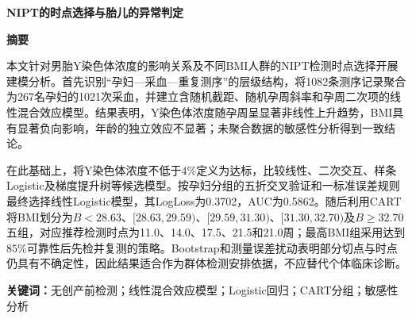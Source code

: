 \documentclass[UTF8,a4paper,12pt,fontset=fandol]{ctexart}
\begin{document}
\setcounter{page}{1}

\begin{center}
  {\bfseries NIPT的时点选择与胎儿的异常判定}
\end{center}

\begin{center}
  {\bfseries 摘\quad 要}
\end{center}

本文针对男胎Y染色体浓度的影响关系及不同BMI人群的NIPT检测时点选择开展建模分析。首先识别“孕妇---采血---重复测序”的层级结构，将1082条测序记录聚合为267名孕妇的1021次采血，并建立含随机截距、随机孕周斜率和孕周二次项的线性混合效应模型。结果表明，Y染色体浓度随孕周呈显著非线性上升趋势，BMI具有显著负向影响，年龄的独立效应不显著；未聚合数据的敏感性分析得到一致结论。

在此基础上，将Y染色体浓度不低于$4\%$定义为达标，比较线性、二次交互、样条Logistic及梯度提升树等候选模型。按孕妇分组的五折交叉验证和一标准误差规则最终选择线性Logistic模型，其LogLoss为0.3702，AUC为0.5862。随后利用CART将BMI划分为$B<28.63$、$[28.63,29.59)$、$[29.59,31.30)$、$[31.30,32.70)$及$B\geq32.70$五组，对应推荐检测时点为11.0、14.0、17.5、21.5和21.0周；最高BMI组采用达到$85\%$可靠性后先检并复测的策略。Bootstrap和测量误差扰动表明部分切点与时点仍具有不确定性，因此结果适合作为群体检测安排依据，不应替代个体临床诊断。

\vspace{0.8em}
\noindent\textbf{关键词：}无创产前检测；线性混合效应模型；Logistic回归；CART分组；敏感性分析

\newpage











\end{document}
